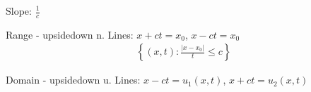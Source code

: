 Slope: $\frac{1}{c}$

Range - upsidedown n. Lines: $x + ct = x_0$, $x - ct = x_0$
%
\begin{align}
  \left\{ (x, t) : \frac{|x - x_0|}{t} \leq c \right\}
\end{align}

Domain - upsidedown u. Lines: $x - ct = u_1(x, t)$, $x + ct = u_2(x, t)$
